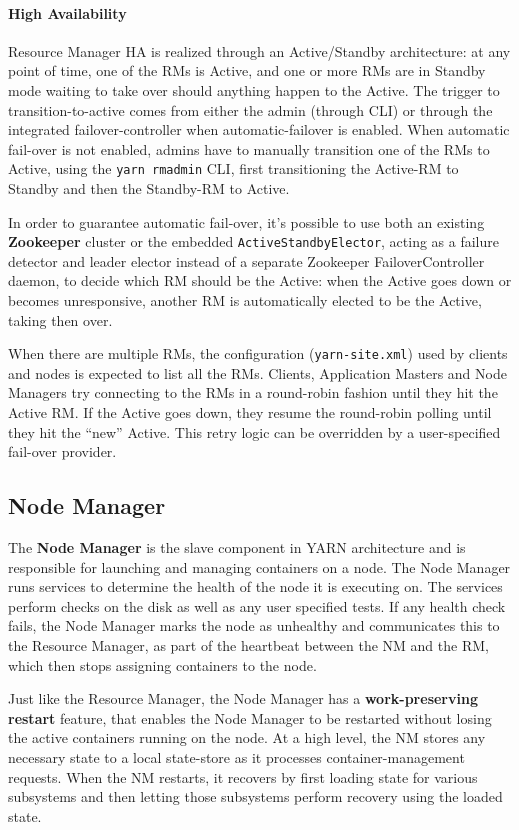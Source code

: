\paragraph{High Availability} Resource Manager HA is realized through an Active/Standby architecture: at any point of time, one of the RMs is Active, and one or more RMs are in Standby mode waiting to take over should anything happen to the Active. The trigger to transition-to-active comes from either the admin (through CLI) or through the integrated failover-controller when automatic-failover is enabled. When automatic fail-over is not enabled, admins have to manually transition one of the RMs to Active, using the \verb|yarn rmadmin| CLI, first transitioning the Active-RM to Standby and then the Standby-RM to Active.

In order to guarantee automatic fail-over, it's possible to use both an existing \textbf{Zoo\-keeper} cluster or the embedded \verb|ActiveStandbyElector|, acting as a failure detector and leader elector instead of a separate Zookeeper FailoverController daemon, to decide which RM should be the Active: when the Active goes down or becomes unresponsive, another RM is automatically elected to be the Active, taking then over.

When there are multiple RMs, the configuration (\verb|yarn-site.xml|) used by clients and nodes is expected to list all the RMs. Clients, Application Masters and Node Managers try connecting to the RMs in a round-robin fashion until they hit the Active RM. If the Active goes down, they resume the round-robin polling until they hit the “new” Active. This retry logic can be overridden by a user-specified fail-over provider.

\subsection{Node Manager}

The \textbf{Node Manager} is the slave component in YARN architecture and is responsible for launching and managing containers on a node. The Node Manager runs services to determine the health of the node it is executing on. The services perform checks on the disk as well as any user specified tests. If any health check fails, the Node Manager marks the node as unhealthy and communicates this to the Resource Manager, as part of the heartbeat between the NM and the RM, which then stops assigning containers to the node.

Just like the Resource Manager, the Node Manager has a \textbf{work-preserving restart} feature, that enables the Node Manager to be restarted without losing the active containers running on the node. At a high level, the NM stores any necessary state to a local state-store as it processes container-management requests. When the NM restarts, it recovers by first loading state for various subsystems and then letting those subsystems perform recovery using the loaded state. 

